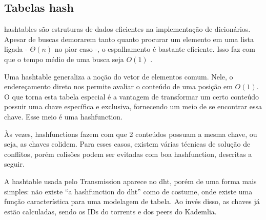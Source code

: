 
\newpage
\subsection*{Tabelas hash}

\Glspl{hashtable} são estruturas de dados eficientes na implementação de dicionários.
Apesar de buscas demorarem tanto quanto procurar um elemento em uma lista ligada -
$\Theta(n)$ no pior caso -, o espalhamento é bastante eficiente. Isso faz com que o
tempo médio de uma busca seja $O(1)$ \cite{book:clrs}.

Uma \gls*{hashtable} generaliza a noção do vetor de elementos comum. Nele, o
endereçamento direto nos permite avaliar o conteúdo de uma posição em $O(1)$. O que
torna esta tabela especial é a vantagem de transformar um certo conteúdo possuir uma
chave específica e exclusiva, fornecendo um meio de se encontrar essa chave. Esse meio é
uma \gls{hashfunction}.

Às vezes, \glspl*{hashfunction} fazem com que 2 conteúdos possuam a mesma chave, ou
seja, as chaves colidem. Para esses casos, existem várias técnicas de solução de
conflitos, porém colisões podem ser evitadas com boa \gls*{hashfunction}, descritas a
seguir.

A \gls*{hashtable} usada pelo Transmission aparece no \gls*{dht}, porém de uma forma
mais simples: não existe ``a \gls*{hashfunction} do \gls*{dht}'' como de costume, onde
existe uma função característica para uma modelagem de tabela. Ao invés disso, as chaves
já estão calculadas, sendo os IDs do \glspl*{torrent} e dos \glspl*{peer} do Kademlia.